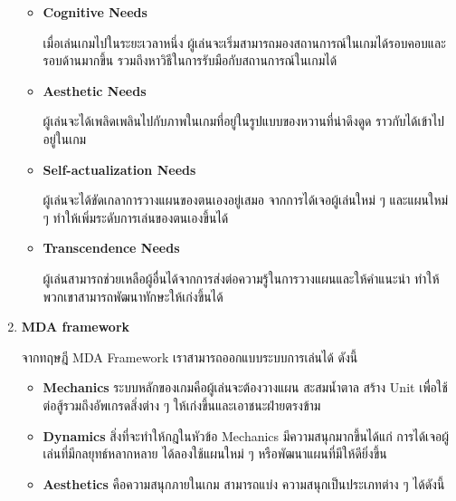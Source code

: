 \documentclass[12pt,oneside,openright,a4paper]{cpe-thai-project}
\begin{document}
\begin{enumerate}
\begin{itemize}
    \item \textbf{Cognitive Needs} 
    
    เมื่อเล่นเกมไปในระยะเวลาหนึ่ง ผู้เล่นจะเริ่มสามารถมองสถานการณ์ในเกมได้รอบคอบและรอบด้านมากขึ้น รวมถึงหาวิธีในการรับมือกับสถานการณ์ในเกมได้
    
    \item \textbf{Aesthetic Needs} 
    
    ผู้เล่นจะได้เพลิดเพลินไปกับภาพในเกมที่อยู่ในรูปแบบของหวานที่น่าดึงดูด ราวกับได้เข้าไปอยู่ในเกม
    
    \item \textbf{Self-actualization Needs} 
    
    ผู้เล่นจะได้ขัดเกลาการวางแผนของตนเองอยู่เสมอ จากการได้เจอผู้เล่นใหม่ ๆ และแผนใหม่ ๆ ทำให้เพิ่มระดับการเล่นของตนเองขึ้นได้
    
    \item \textbf{Transcendence Needs} 
    
    ผู้เล่นสามารถช่วยเหลือผู้อื่นได้จากการส่งต่อความรู้ในการวางแผนและให้คำแนะนำ ทำให้พวกเขาสามารถพัฒนาทักษะให้เก่งขึ้นได้
  \end{itemize}


  \item \textbf{MDA framework}
  
  จากทฤษฎี MDA Framework เราสามารถออกแบบระบบการเล่นได้ ดังนี้

  \begin{itemize}
    \item \textbf{Mechanics} ระบบหลักของเกมคือผู้เล่นจะต้องวางแผน 
    สะสมน้ำตาล สร้าง Unit เพื่อใช้ต่อสู้รวมถึงอัพเกรดสิ่งต่าง ๆ 
    ให้เก่งขึ้นและเอาชนะฝ่ายตรงข้าม
    \item \textbf{Dynamics} สิ่งที่จะทำให้กฎในหัวข้อ Mechanics 
    มีความสนุกมากขึ้นได้แก่ การได้เจอผู้เล่นที่มีกลยุทธ์หลากหลาย ได้ลองใช้แผนใหม่ ๆ 
    หรือพัฒนาแผนที่มีให้ดียิ่งขึ้น
    \item \textbf{Aesthetics} คือความสนุกภายในเกม สามารถแบ่ง
    ความสนุกเป็นประเภทต่าง ๆ ได้ดังนี้


\end{itemize}
\end{enumerate}
\end{document}
